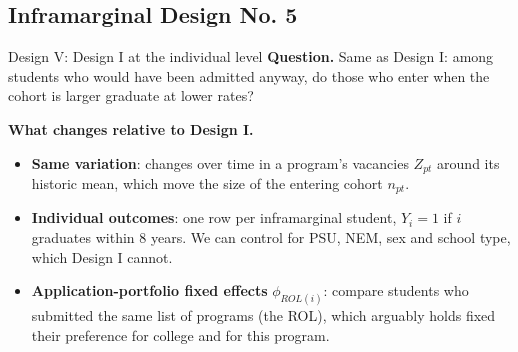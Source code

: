 \documentclass{beamer}
\begin{document}
\subsection{Inframarginal Design No. 5}
\begin{frame}{Design V: Design I at the individual level}
\footnotesize
\textbf{Question.} Same as Design I: among students who would have been admitted anyway, do those who enter when the
cohort is larger graduate at lower rates?

\vspace{0.12cm}
\textbf{What changes relative to Design I.}
\begin{itemize}
    \item \textbf{Same variation}: changes over time in a program's vacancies $Z_{pt}$ around its historic mean, which move the size of the entering cohort $n_{pt}$.
    \item \textbf{Individual outcomes}: one row per inframarginal student, $Y_i=1$ if $i$ graduates within 8 years.
    We can control for PSU, NEM, sex and school type, which Design I cannot.
    \item \textbf{Application-portfolio fixed effects} $\phi_{ROL(i)}$: compare students who submitted the same list of programs (the ROL),
    which arguably holds fixed their preference for college and for this program.
    
\end{itemize}
\end{frame}
\end{document}
